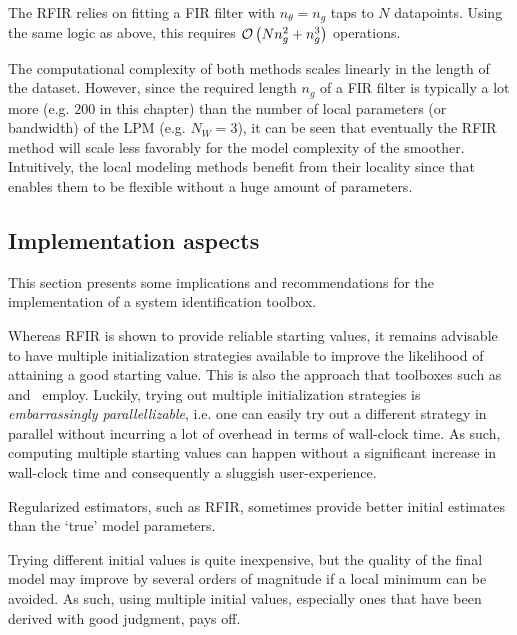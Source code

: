 The \gls{RFIR} relies on fitting a \gls{FIR} filter with $n_{\theta} = n_g$ taps to $N$ datapoints.
Using the same logic as above, this requires $\mathcal{O} \left( N n_{g}^2 + n_g^3 \right)$ operations.

The computational complexity  of both methods scales linearly in the length of the dataset.
However, since the required length $n_g$ of a \gls{FIR} filter is typically a lot more (e.g. $200$ in this chapter) than the number of local parameters (or bandwidth) of the \gls{LPM} (e.g. $N_W = 3$), it can be seen that eventually the \gls{RFIR} method will scale less favorably for the model complexity of the smoother.
Intuitively, the local modeling methods benefit from their locality since that enables them to be flexible without a huge amount of parameters.

\subsection{Implementation aspects}
This section presents some implications and recommendations for the implementation of  a system identification toolbox.

Whereas \gls{RFIR} is shown to provide reliable starting values, it remains advisable to have multiple initialization strategies available to improve the likelihood of attaining a good starting value.
This is also the approach that toolboxes such as~\citep{FDIDENT} and~\citep{TDIDENT} employ.
Luckily, trying out multiple initialization strategies is \emph{embarrassingly parallellizable}, i.e. one can easily try out a different strategy in parallel without incurring a lot of overhead in terms of wall-clock time.
As such, computing multiple starting values can happen without a significant increase in wall-clock time and consequently a sluggish user-experience.

\begin{guideline}
\label{guide:initvals:try-regularization}
Regularized estimators, such as \gls{RFIR}, sometimes provide better initial estimates than the `true' model parameters.
\end{guideline}

\begin{guideline}
\label{guide:initvals:try-many-initial-values}
Trying different initial values is quite inexpensive, but the quality of the final model may improve by several orders of magnitude if a local minimum can be avoided.
As such, using multiple initial values, especially ones that have been derived with good judgment, pays off.
\end{guideline}

